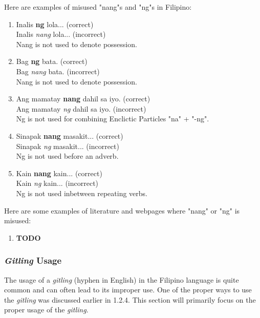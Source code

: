\begin{example}
      Here are examples of misused "nang"s and "ng"s in Filipino:
\end{example}
\begin{enumerate}
      \item Inalis \textbf{ng} lola... (correct) \\
            Inalis \textit{nang} lola... (incorrect) \\
            Nang is not used to denote possession.
      \item Bag \textbf{ng} bata. (correct) \\
            Bag \textit{nang} bata. (incorrect) \\
            Nang is not used to denote possession.
      \item Ang mamatay \textbf{nang} dahil sa iyo. (correct) \\
            Ang mamatay \textit{ng} dahil sa iyo. (incorrect) \\
            Ng is not used for combining Enclictic Particles "na" + "-ng".
      \item Sinapak \textbf{nang} masakit... (correct) \\
            Sinapak \textit{ng} masakit... (incorrect) \\
            Ng is not used before an adverb.
      \item Kain \textbf{nang} kain... (correct) \\
            Kain \textit{ng} kain... (incorrect) \\
            Ng is not used inbetween repeating verbs.
\end{enumerate}

\begin{example}
      Here are some examples of literature and webpages where "nang" or "ng" is
      misused:
\end{example}
\begin{enumerate}
      \item \textbf{TODO}
\end{enumerate}

\subsubsection{\textit{Gitling} Usage}
The usage of a \textit{\textit{gitling}} (hyphen in English) in the Filipino language is quite common and can often lead to its improper use. One of the proper ways to use the \textit{\textit{gitling}} was discussed earlier in 1.2.4. This section will primarily focus on the proper usage of the \textit{\textit{gitling}}.

